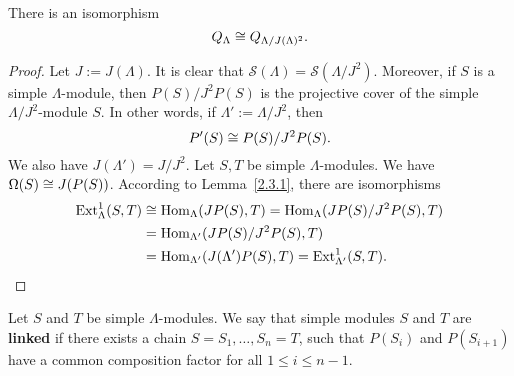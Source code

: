 %




\begin{lemma} \label{2.3.3}
  There is an isomorphism
%
  \[ Q_\Lambda \cong Q_{\Lambda/J(\Lambda)^2}.\]
\end{lemma}


\begin{proof}
Let $J:=J(\Lambda)$. It is clear that $\mathcal S(\Lambda) = \mathcal S(\Lambda / J^2)$. Moreover, if $S$ is a simple
$\Lambda$-module, then $P(S) / J^2 P(S)$ is the projective cover of the simple $\Lambda/J^2$-module $S$.
In other words, if $\Lambda' := \Lambda/J^2$, then
\[
P'(S) \cong P(S)/J^2 P(S).
\] 
We also have $J(\Lambda') = J/J^2$. Let $S, T$ be simple $\Lambda$-modules. We have $\Omega(S) \cong J(P(S))$. According to Lemma~\ref{2.3.1}, there are isomorphisms
%
\begin{align*}
  \operatorname{Ext}_\Lambda^1(S,T) &\cong \operatorname{Hom}_\Lambda(J P(S), T) = \operatorname{Hom}_{\Lambda}(JP(S)/J^2 P(S), T)\\
             & = \operatorname{Hom}_{\Lambda'}(JP(S)/J^2 P(S), T)\\
             & = \operatorname{Hom}_{\Lambda'}(J(\Lambda')P(S),T)
               = \operatorname{Ext}_{\Lambda'}^1(S,T).\qedhere
\end{align*}
%
\end{proof}


\begin{definition}
Let $S$ and $T$ be simple $\Lambda$-modules. We say that simple modules $S$ and $T$
are \textbf{linked} if there exists a chain $S=S_1, \ldots, S_n = T$, such that
$P(S_i)$ and $P(S_{i+1})$ have a common composition factor for all $1 \leq i \leq n-1$.
\end{definition}

